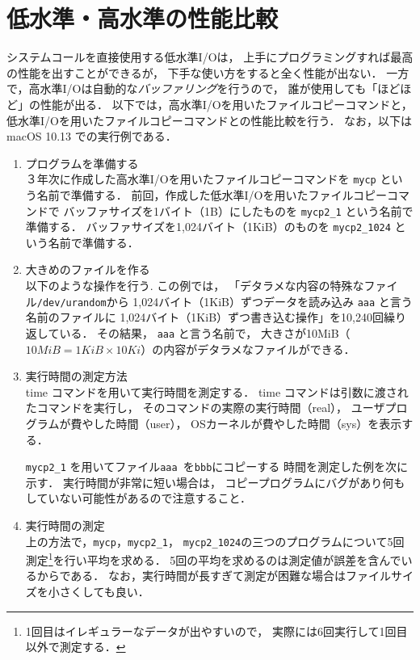 \section{低水準・高水準の性能比較}
システムコールを直接使用する低水準I/Oは，
上手にプログラミングすれば最高の性能を出すことができるが，
下手な使い方をすると全く性能が出ない．
一方で，高水準I/Oは自動的な\emph{バッファリング}を行うので，
誰が使用しても「ほどほど」の性能が出る．
以下では，高水準I/Oを用いたファイルコピーコマンドと，
低水準I/Oを用いたファイルコピーコマンドとの性能比較を行う．
なお，以下は macOS 10.13 での実行例である．

\begin{enumerate}
\item プログラムを準備する  \\
３年次に作成した高水準I/Oを用いたファイルコピーコマンドを
\texttt{mycp} という名前で準備する．
前回，作成した低水準I/Oを用いたファイルコピーコマンドで
バッファサイズを1バイト（1B）にしたものを
\texttt{mycp2\_1} という名前で準備する．
バッファサイズを1,024バイト（1KiB）のものを
\texttt{mycp2\_1024} という名前で準備する．

\item 大きめのファイルを作る \\
以下のような操作を行う.
この例では，
「デタラメな内容の特殊なファイル\texttt{/dev/urandom}から
1,024バイト（1KiB）ずつデータを読み込み
\texttt{aaa} と言う名前のファイルに
1,024バイト（1KiB）ずつ書き込む操作」を10,240回繰り返している．
その結果， \texttt{aaa} と言う名前で，
大きさが10MiB（$10MiB = 1KiB \times 10Ki$）の内容がデタラメなファイルができる．



\item 実行時間の測定方法 \\
time コマンドを用いて実行時間を測定する．
time コマンドは引数に渡されたコマンドを実行し，
そのコマンドの実際の実行時間（real），
ユーザプログラムが費やした時間（user），
OSカーネルが費やした時間（sys）を表示する．

\texttt{mycp2\_1} を用いてファイル\texttt{aaa }を\texttt{bbb}にコピーする
時間を測定した例を次に示す．
実行時間が非常に短い場合は，
コピープログラムにバグがあり何もしていない可能性があるので注意すること．



\item 実行時間の測定 \\
上の方法で，\texttt{mycp}，\texttt{mycp2\_1}，
\texttt{mycp2\_1024}の三つのプログラムについて5回測定\footnote{
1回目はイレギュラーなデータが出やすいので，
実際には6回実行して1回目以外で測定する．
}を行い平均を求める．
5回の平均を求めるのは測定値が誤差を含んでいるからである．
なお，実行時間が長すぎて測定が困難な場合はファイルサイズを小さくしても良い．
\end{enumerate}

